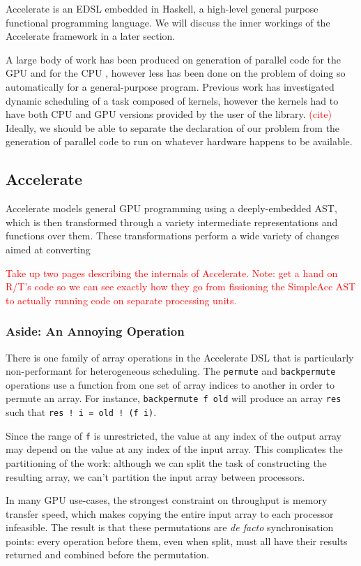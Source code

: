 \documentclass[a4paper,12pt]{article}
\newcommand{\red}[1]{\textcolor{red}{#1}}
\newcommand{\icf}[1]{\mbox{\texttt{#1}}}
\begin{document}
Accelerate is an EDSL embedded in Haskell, a high-level general purpose functional programming language. 
We will discuss the inner workings of the Accelerate framework in a later section.

A large body of work has been produced on generation of parallel code for the GPU and for the CPU \citep{lee_transparent_2013}, however less has been done on the problem of doing so automatically for a general-purpose program. 
Previous work has investigated dynamic scheduling of a task composed of kernels, however the kernels had to have both CPU and GPU versions provided by the user of the library. 
\red{(cite)} 
Ideally, we should be able to separate the declaration of our problem from the generation of parallel code to run on whatever hardware happens to be available.

\subsection{Accelerate}
Accelerate models general GPU programming using a deeply-embedded AST, which is then transformed through a variety intermediate representations and functions over them.
These transformations perform a wide variety of changes aimed at converting 

\red{Take up two pages describing the internals of Accelerate. Note: get a hand on R/T's code so we can see exactly how they go from fissioning the SimpleAcc AST to actually running code on separate processing units.}


\subsubsection*{Aside: An Annoying Operation}
There is one family of array operations in the Accelerate DSL that is particularly non-performant for heterogeneous scheduling.
The \icf{permute} and \icf{backpermute} operations use a function from one set of array indices to another in order to permute an array.
For instance, \icf{backpermute\ f\ old} will produce an array \icf{res} such that \icf{res\ !\ i =\ old !\ (f\ i)}.

Since the range of \icf{f} is unrestricted, the value at any index of the output array may depend on the value at any index of the input array.
This complicates the partitioning of the work: although we can split the task of constructing the resulting array, we can't partition the input array between processors.

In many GPU use-cases, the strongest constraint on throughput is memory transfer speed, which makes copying the entire input array to each processor infeasible.
The result is that these permutations are \textit{de facto} synchronisation points: every operation before them, even when split, must all have their results returned and combined before the permutation.
\end{document}
